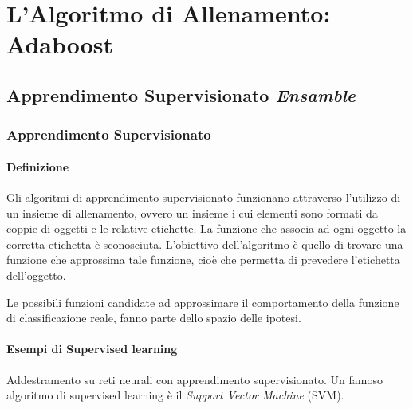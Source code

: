 
\chapter{L'Algoritmo di Allenamento: Adaboost}
\label{chap:adaboost}
    \section{Apprendimento Supervisionato \emph{Ensamble}}
    \label{sec:supervised_ensamble_learning}
        \subsection{Apprendimento Supervisionato}
        \label{sub:supervised_learning}
            \subsubsection{Definizione}
                Gli algoritmi di apprendimento supervisionato funzionano attraverso l'utilizzo di un insieme di allenamento, ovvero un insieme i cui elementi sono formati da coppie di oggetti e le relative etichette.
                La funzione che associa ad ogni oggetto la corretta etichetta è sconosciuta.
                L'obiettivo dell'algoritmo è quello di trovare una funzione che approssima tale funzione, cioè che permetta di prevedere l'etichetta dell'oggetto.

                Le possibili funzioni candidate ad approssimare il comportamento della funzione di classificazione reale, fanno parte dello spazio delle ipotesi.

            \subsubsection{Esempi di Supervised learning}
                Addestramento su reti neurali con apprendimento supervisionato.
                Un famoso algoritmo di supervised learning è il \emph{Support Vector Machine} (SVM).

